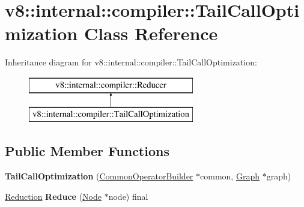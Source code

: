 \hypertarget{classv8_1_1internal_1_1compiler_1_1_tail_call_optimization}{}\section{v8\+:\+:internal\+:\+:compiler\+:\+:Tail\+Call\+Optimization Class Reference}
\label{classv8_1_1internal_1_1compiler_1_1_tail_call_optimization}
Inheritance diagram for v8\+:\+:internal\+:\+:compiler\+:\+:Tail\+Call\+Optimization\+:\begin{figure}[H]
\begin{center}
\leavevmode
\includegraphics[height=2.000000cm]{classv8_1_1internal_1_1compiler_1_1_tail_call_optimization}
\end{center}
\end{figure}
\subsection*{Public Member Functions}
\begin{DoxyCompactItemize}
\item 
{\bfseries Tail\+Call\+Optimization} (\hyperlink{classv8_1_1internal_1_1compiler_1_1_common_operator_builder}{Common\+Operator\+Builder} $\ast$common, \hyperlink{classv8_1_1internal_1_1compiler_1_1_graph}{Graph} $\ast$graph)\hypertarget{classv8_1_1internal_1_1compiler_1_1_tail_call_optimization_a8e03f8207be923e3754ca9ca9400e85a}{}\label{classv8_1_1internal_1_1compiler_1_1_tail_call_optimization_a8e03f8207be923e3754ca9ca9400e85a}

\item 
\hyperlink{classv8_1_1internal_1_1compiler_1_1_reduction}{Reduction} {\bfseries Reduce} (\hyperlink{classv8_1_1internal_1_1compiler_1_1_node}{Node} $\ast$node) final\hypertarget{classv8_1_1internal_1_1compiler_1_1_tail_call_optimization_a0fee6ab9821a79ab7184b0dfcff5a62f}{}\label{classv8_1_1internal_1_1compiler_1_1_tail_call_optimization_a0fee6ab9821a79ab7184b0dfcff5a62f}

\end{DoxyCompactItemize}
